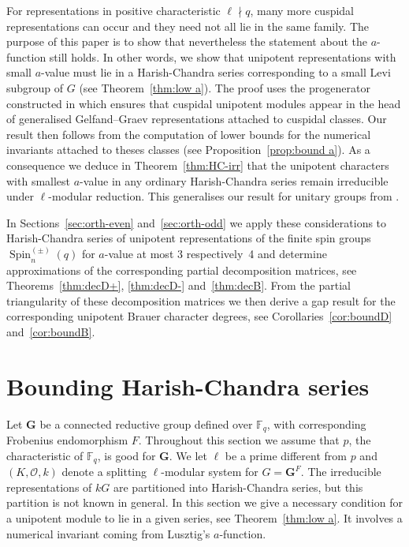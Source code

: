 \documentclass[12pt,leqno,a4paper]{amsart}
\newcommand{\FF}{{\mathbb{F}}}
\newcommand{\bG}{{\mathbf{G}}}
\newcommand{\cO}{{\mathcal{O}}}
\newcommand{\Spin}{{\operatorname{Spin}}}
\theoremstyle{remark}
\begin{document}
For representations in positive characteristic $\ell \nmid q$, many more
cuspidal representations can occur and they need not all lie in the same family.
The purpose of this paper is to show that nevertheless the statement about
the $a$-function still holds. In other words, we show that unipotent
representations with small $a$-value must lie in a Harish-Chandra series
corresponding to a small Levi subgroup of $G$ (see Theorem~\ref{thm:low a}).
The proof uses the progenerator constructed in \cite{DM17} which ensures
that cuspidal unipotent modules appear in the head of generalised
Gelfand--Graev representations attached to cuspidal classes.
Our result then follows from the computation of lower bounds for the numerical
invariants attached to theses classes (see Proposition~\ref{prop:bound a}).
As a consequence we deduce in Theorem~\ref{thm:HC-irr} that the
unipotent characters with smallest $a$-value in any ordinary Harish-Chandra
series remain irreducible under $\ell$-modular reduction. This generalises our
result for unitary groups from \cite{DM15}.

In Sections~\ref{sec:orth-even} and~\ref{sec:orth-odd} we apply these
considerations to Harish-Chandra series of unipotent representations of the
finite spin groups $\Spin_n^{(\pm)}(q)$ for $a$-value at most $3$
respectively~4 and determine approximations of the corresponding partial
decomposition matrices, see Theorems~\ref{thm:decD+}, \ref{thm:decD-}
and~\ref{thm:decB}. From the partial triangularity of these decomposition
matrices we then derive a gap result for the corresponding unipotent Brauer
character degrees, see Corollaries~\ref{cor:boundD} and~\ref{cor:boundB}.
\smallskip



\section{Bounding Harish-Chandra series}   \label{sec:bound}

Let $\bG$ be a connected reductive group defined over $\FF_q$, with
corresponding Frobenius endomorphism $F$. Throughout this section we assume
that $p$, the characteristic of $\FF_q$, is good for $\bG$. We let $\ell$ be
a prime different from $p$ and $(K,\cO,k)$ denote a splitting $\ell$-modular
system for $G = \bG^F$.
The irreducible representations of $kG$ are partitioned into Harish-Chandra
series, but this partition is not known in general. In this section we give
a necessary condition for a unipotent module to lie in a given series, see
Theorem~\ref{thm:low a}.
It involves a numerical invariant coming from Lusztig's $a$-function.
\end{document}
